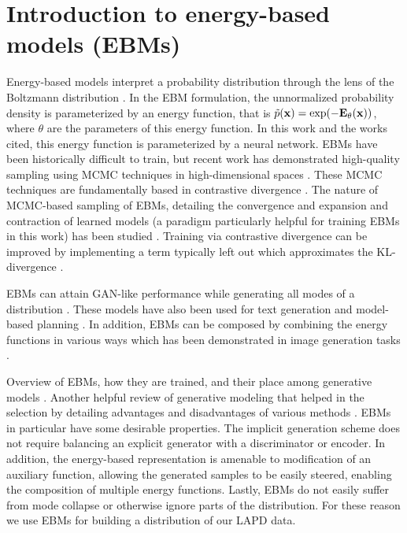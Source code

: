 \section{Introduction to energy-based models (EBMs)}

Energy-based models interpret a probability distribution through the lens of the Boltzmann distribution \cite{hopfield_neural_1982, ackley_learning_1985, lecun_tutorial_2006}. In the EBM formulation, the unnormalized probability density is parameterized by an energy function, that is $\tilde{p}(\bf{x}) = \exp(-E_\theta(\bf{x}))$, where $\theta$ are the parameters of this energy function. In this work and the works cited, this energy function is parameterized by a neural network. EBMs have been historically difficult to train, but recent work has demonstrated high-quality sampling using MCMC techniques in high-dimensional spaces \cite{du_model_2019, du_implicit_2020, du_improved_2021, du_compositional_2020, du_unsupervised_2021, nijkamp_anatomy_2020, nijkamp_learning_2019, deng_residual_2020, gao_learning_2018}. These MCMC techniques are fundamentally based in contrastive divergence \cite{hinton_training_2002, ruslan_deep_2009, tieleman_training_2008}. The nature of MCMC-based sampling of EBMs, detailing the convergence and expansion and contraction of learned models (a paradigm particularly helpful for training EBMs in this work) has been studied \cite{nijkamp_anatomy_2020, nijkamp_learning_2019}. Training via contrastive divergence can be improved by implementing a term typically left out which approximates the KL-divergence \cite{du_improved_2021}. 

EBMs can attain GAN-like performance while generating all modes of a distribution \cite{du_implicit_2020}. These models have also been used for text generation \cite{deng_residual_2020} and model-based planning \cite{du_model_2019}. In addition, EBMs can be composed by combining the energy functions in various ways which has been demonstrated in image generation tasks \cite{du_compositional_2020, du_unsupervised_2021}.

Overview of EBMs, how they are trained, and their place among generative models \cite{carbone_hitchhikers_2024}. Another helpful review of generative modeling that helped in the selection by detailing advantages and disadvantages of various methods \cite{bond-taylor_deep_2021}. EBMs in particular have some desirable properties. The implicit generation scheme does not require balancing an explicit generator with a discriminator or encoder. In addition, the energy-based representation is amenable to modification of an auxiliary function, allowing the generated samples to be easily steered, enabling the composition of multiple energy functions. Lastly, EBMs do not easily suffer from mode collapse or otherwise ignore parts of the distribution. For these reason we use EBMs for building a distribution of our LAPD data.

